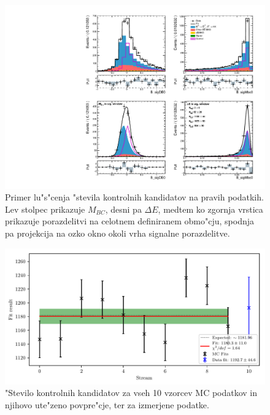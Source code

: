 \begin{otherlanguage}{slovene}
\begin{figure}[H]
	\centering
	\captionsetup{width=0.8\linewidth}
	\includegraphics[width=\linewidth]{fig/cs_fit_data}
	\caption{Primer lu"s"cenja "stevila kontrolnih kandidatov na pravih podatkih. Lev stolpec prikazuje $M_{BC}$, desni pa $\Delta E$, medtem ko zgornja vrstica prikazuje porazdelitvi na celotnem definiranem obmo"cju, spodnja pa projekcija na ozko okno okoli vrha signalne porazdelitve.}
	\label{fig:cs_fit_data_si}
\end{figure}

\begin{figure}[H]
	\centering
	\captionsetup{width=0.8\linewidth}
	\includegraphics[width=\linewidth]{fig/cs_global}
	\caption{"Stevilo kontrolnih kandidatov za vseh 10 vzorcev MC podatkov in njihovo ute"zeno povpre"cje, ter za izmerjene podatke.}
	\label{fig:cs_global_si}
\end{figure}


\end{otherlanguage}
